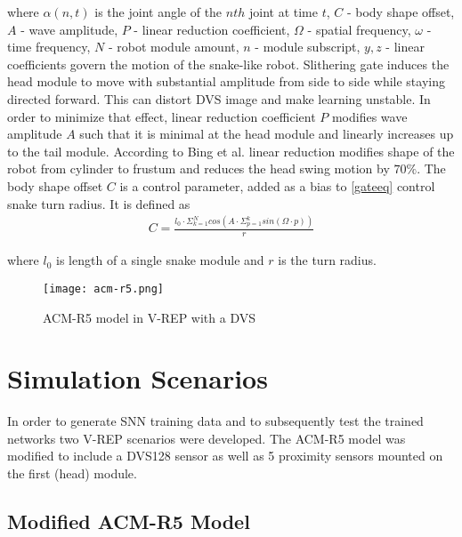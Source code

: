 where \(\alpha(n, t)\) is the joint angle of the \(nth\) joint at time \(t\), \(C\) - body shape offset, \(A\) - wave amplitude, \(P\) - linear reduction coefficient,  \(\Omega\) - spatial frequency,  \(\omega\) - time frequency, \(N\) - robot module amount, \(n\) - module subscript, \(y,z\) - linear coefficients govern the motion of the snake-like robot. Slithering gate induces the head module to move with substantial amplitude from side to side while staying directed forward. This can distort DVS image and make learning unstable. In order to minimize that effect, linear reduction coefficient \(P\) modifies wave amplitude \(A\) such that it is minimal at the head module and linearly increases up to the tail module. According to Bing et al. \cite{4} linear reduction modifies shape of the robot from cylinder to frustum and reduces the head swing motion by \(70\%\). The body shape offset \(C\) is a control parameter, added as a bias to \ref{gateeq} control snake turn radius. It is defined as
\begin{gather*}
C = \frac{l_0 \cdot \Sigma_{k=1}^N cos(A\cdot \Sigma_{p=1}^k sin(\Omega \cdot p))}{r}
\end{gather*}

where \(l_0\) is length of a single snake module and \(r\) is the turn radius.

\begin{figure}[h]
	\begin{center}
		\texttt{[image: acm-r5.png]}
		\caption{ACM-R5 model in V-REP with a DVS\label{fig:acm-r5}}  
	\end{center}
\end{figure}

\section{Simulation Scenarios}\label{simscen}
In order to generate SNN training data and to subsequently test the trained networks two V-REP scenarios were developed. The ACM-R5 model was modified to include a DVS128 sensor as well as 5 proximity sensors mounted on the first (head) module. 
\subsection{Modified ACM-R5 Model}

